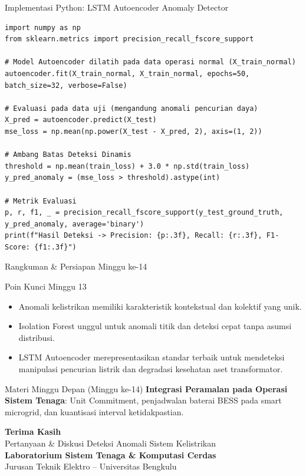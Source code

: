 \documentclass[aspectratio=169, 10pt]{beamer}
\begin{document}
\begin{frame}[fragile]{Implementasi Python: LSTM Autoencoder Anomaly Detector}
\begin{lstlisting}
import numpy as np
from sklearn.metrics import precision_recall_fscore_support

# Model Autoencoder dilatih pada data operasi normal (X_train_normal)
autoencoder.fit(X_train_normal, X_train_normal, epochs=50, batch_size=32, verbose=False)

# Evaluasi pada data uji (mengandung anomali pencurian daya)
X_pred = autoencoder.predict(X_test)
mse_loss = np.mean(np.power(X_test - X_pred, 2), axis=(1, 2))

# Ambang Batas Deteksi Dinamis
threshold = np.mean(train_loss) + 3.0 * np.std(train_loss)
y_pred_anomaly = (mse_loss > threshold).astype(int)

# Metrik Evaluasi
p, r, f1, _ = precision_recall_fscore_support(y_test_ground_truth, y_pred_anomaly, average='binary')
print(f"Hasil Deteksi -> Precision: {p:.3f}, Recall: {r:.3f}, F1-Score: {f1:.3f}")
\end{lstlisting}
\end{frame}

\begin{frame}{Rangkuman \& Persiapan Minggu ke-14}
    \begin{block}{Poin Kunci Minggu 13}
        \begin{itemize}
            \item Anomali kelistrikan memiliki karakteristik kontekstual dan kolektif yang unik.
            \item Isolation Forest unggul untuk anomali titik dan deteksi cepat tanpa asumsi distribusi.
            \item LSTM Autoencoder merepresentasikan standar terbaik untuk mendeteksi manipulasi pencurian listrik dan degradasi kesehatan aset transformator.
        \end{itemize}
    \end{block}
    \vspace{0.2cm}
    \begin{alertblock}{Materi Minggu Depan (Minggu ke-14)}
        \textbf{Integrasi Peramalan pada Operasi Sistem Tenaga}: Unit Commitment, penjadwalan baterai BESS pada smart microgrid, dan kuantisasi interval ketidakpastian.
    \end{alertblock}
\end{frame}

\begin{frame}[plain]
    \begin{center}
        \vspace{1.5cm}
        {\Huge \color{mainblue} \textbf{Terima Kasih}}\\[0.4cm]
        {\large Pertanyaan \& Diskusi Deteksi Anomali Sistem Kelistrikan}\\[1.2cm]
        \textbf{Laboratorium Sistem Tenaga \& Komputasi Cerdas}\\
        Jurusan Teknik Elektro -- Universitas Bengkulu
    \end{center}
\end{frame}
\end{document}
